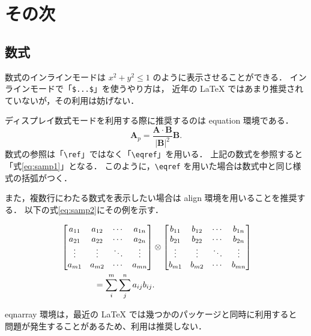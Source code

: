 \chapter{その次}
\label{chp:second}

\section{数式}
\label{sec:eqn}

数式のインラインモードは \(x^2 + y^2 \leq 1\) のように表示させることができる．
インラインモードで「\verb+$...$+」を使うやり方は，
近年の LaTeX ではあまり推奨されていないが，その利用は妨げない．

ディスプレイ数式モードを利用する際に推奨するのは equation 環境である．
\begin{equation}
	\mathbf{A}_p = \frac{\mathbf{A}\cdot\mathbf{B}}{|\mathbf{B}|^2}\mathbf{B} .
	\label{eq:samp1}
\end{equation}
数式の参照は「\verb+\ref+」ではなく「\verb+\eqref+」を用いる．
上記の数式を参照すると「式\eqref{eq:samp1}」となる．
このように，\verb+\eqref+ を用いた場合は数式中と同じ様式の括弧がつく．

また，複数行にわたる数式を表示したい場合は align 環境を用いることを推奨する．
以下の式\eqref{eq:samp2}にその例を示す．

\begin{align}
	& \begin{bmatrix}
	a_{11} & a_{12} & \cdots & a_{1n} \\
	a_{21} & a_{22} & \cdots & a_{2n} \\
	\vdots & \vdots & \ddots & \vdots \\
	a_{m1} & a_{m2} & \cdots & a_{mn} \\
	\end{bmatrix}
	\otimes
	\begin{bmatrix}
	b_{11} & b_{12} & \cdots & b_{1n} \\
	b_{21} & b_{22} & \cdots & b_{2n} \\
	\vdots & \vdots & \ddots & \vdots \\
	b_{m1} & b_{m2} & \cdots & b_{mn} \\
	\end{bmatrix} \notag \\
	& \qquad \qquad = \sum_{i}^{m}\sum_{j}^{n}a_{ij}b_{ij} .
	\label{eq:samp2}
\end{align}

eqnarray 環境は，最近の LaTeX では幾つかのパッケージと同時に利用すると
問題が発生することがあるため、利用は推奨しない．

